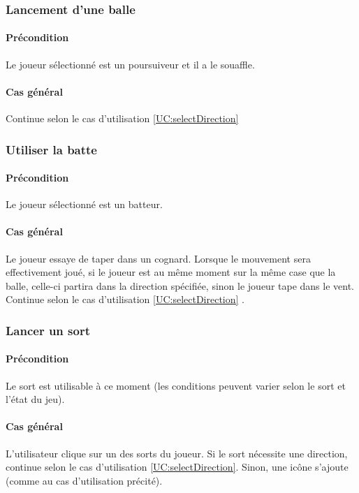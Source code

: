 \subsubsection{Lancement d'une balle}
    \paragraph{Précondition} Le joueur sélectionné est un \gls{poursuiveur} et il a le \gls{souaffle}.
    \paragraph{Cas général} Continue selon le cas d'utilisation \ref{UC:selectDirection}

\subsubsection{Utiliser la batte}
    \paragraph{Précondition} Le joueur sélectionné est un \gls{batteur}.
    \paragraph{Cas général} Le joueur essaye de taper dans un \gls{cognard}. Lorsque le mouvement sera effectivement joué, si le joueur est au même moment sur la même case que la balle, celle-ci partira dans la direction spécifiée, sinon le joueur tape dans le vent. Continue selon le cas d'utilisation \ref{UC:selectDirection} .

\subsubsection{Lancer un sort}
    \label{UC:castSpell}
    \paragraph{Précondition} Le sort est utilisable à ce moment (les conditions peuvent varier selon le sort et l'état du jeu).
    \paragraph{Cas général} L'utilisateur clique sur un des sorts du joueur. Si le sort nécessite une direction, continue selon le cas d'utilisation \ref{UC:selectDirection}. Sinon, une icône s'ajoute (comme au cas d'utilisation précité).
